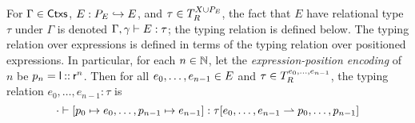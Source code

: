 For $\Gamma \in \mathsf{Ctxs}$, $E : P_E \hookrightarrow E$, and
$\tau \in T_R^{X \cup P_E}$, the fact that $E$ have relational type $\tau$
under $\Gamma$ is denoted $\Gamma, \gamma \vdash E : \tau$;
%
the typing relation is defined below.
%
The typing relation over expressions is defined in terms of the typing
relation over positioned expressions.
%
In particular, for each $n \in \mathbb{N}$, let the
\emph{expression-position encoding} of $n$ be
$p_{n} = \mathsf{l} \mathbin{::} \mathsf{r}^{n}$.
%
Then for all $e_0, \ldots, e_{n - 1} \in E$ and
$\tau \in T_{R}^{ e_0, \ldots, e_{n - 1} }$, the typing relation
$e_0, \ldots, e_{n - 1} : \tau$ is
\[ \cdot \judges [ \pos{0} \mapsto e_0, \ldots, \pos{n - 1} \mapsto
  e_{n - 1} ] : %
  \rename{ \tau }{ e_0, \ldots, e_{n - 1} }{ %
    \pos{0}, \ldots, \pos{n - 1} } \]

